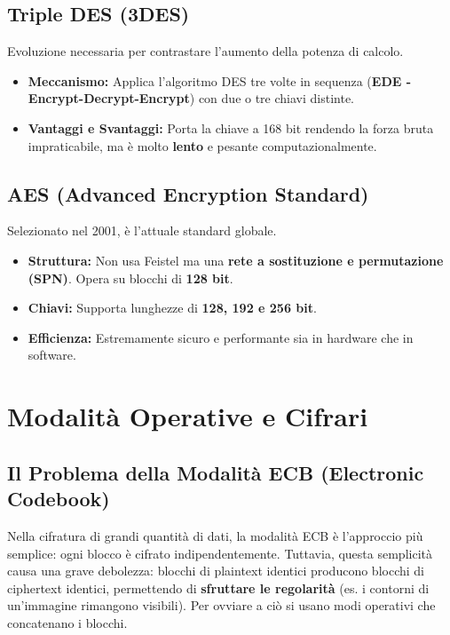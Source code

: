 \subsection{Triple DES (3DES)}
Evoluzione necessaria per contrastare l'aumento della potenza di calcolo.
\begin{itemize}
    \item \textbf{Meccanismo:} Applica l'algoritmo DES tre volte in sequenza (\textbf{EDE - Encrypt-Decrypt-Encrypt}) con due o tre chiavi distinte.
    \item \textbf{Vantaggi e Svantaggi:} Porta la chiave a 168 bit rendendo la forza bruta impraticabile, ma è molto \textbf{lento} e pesante computazionalmente.
\end{itemize}

\subsection{AES (Advanced Encryption Standard)}
Selezionato nel 2001, è l'attuale standard globale.
\begin{itemize}
    \item \textbf{Struttura:} Non usa Feistel ma una \textbf{rete a sostituzione e permutazione (SPN)}. Opera su blocchi di \textbf{128 bit}.
    \item \textbf{Chiavi:} Supporta lunghezze di \textbf{128, 192 e 256 bit}.
    \item \textbf{Efficienza:} Estremamente sicuro e performante sia in hardware che in software.
\end{itemize}





\section{Modalità Operative e Cifrari}

\subsection{Il Problema della Modalità ECB (Electronic Codebook)}
Nella cifratura di grandi quantità di dati, la modalità ECB è l'approccio più semplice: ogni blocco è cifrato indipendentemente. Tuttavia, questa semplicità causa una grave debolezza: blocchi di plaintext identici producono blocchi di ciphertext identici, permettendo di \textbf{sfruttare le regolarità} (es. i contorni di un'immagine rimangono visibili). Per ovviare a ciò si usano modi operativi che concatenano i blocchi.

